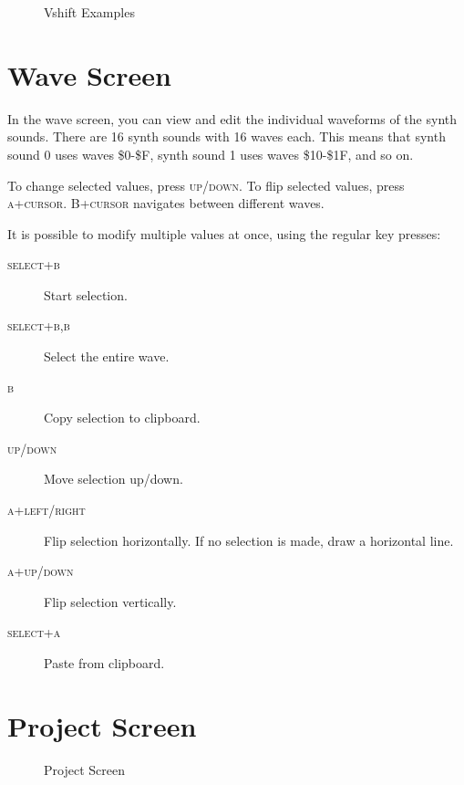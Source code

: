 \begin{figure}[htpb]
	\centering


	\caption{Vshift Examples}
	\label{fig:vshift}
\end{figure}

\section{Wave Screen}
\label{wave-screen-section}

In the wave screen, you can view and edit the individual waveforms of the synth sounds. There are 16 synth sounds with 16 waves each. This means that synth sound 0 uses waves \$0-\$F, synth sound 1 uses waves \$10-\$1F, and so on.

To change selected values, press \textsc{up/down}. To flip selected values, press \textsc{a+cursor}. \textsc{B+cursor} navigates between different waves.

It is possible to modify multiple values at once, using the regular key presses:

\begin{description}
	\item[\textsc{select+b}] Start selection.
	\item[\textsc{select+b,b}] Select the entire wave.
	\item[\textsc{b}] Copy selection to clipboard.
	\item[\textsc{up/down}] Move selection up/down.
	\item[\textsc{a+left/right}] Flip selection horizontally. If no selection is made, draw a horizontal line.
	\item[\textsc{a+up/down}] Flip selection vertically.
	\item[\textsc{select+a}] Paste from clipboard.
\end{description}

\section{Project Screen}

\begin{figure}[htpb]
	\begin{center}
	\end{center}
	\caption{Project Screen}
	\label{fig:project}
\end{figure}

